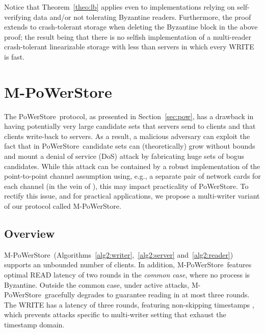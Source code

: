 \documentclass[10pt,conference,compsocconf]{IEEEtran}
\newcommand{\protocol}{PoWerStore}
\newcommand{\mprotocol}{M-PoWerStore}
\begin{document}
Notice that Theorem~\ref{theo:lb} applies even to implementations relying on self-verifying data and/or not tolerating Byzantine readers. Furthermore, the proof extends to crash-tolerant storage when deleting the Byzantine block  in the above proof; the result being that there is no selfish implementation of a multi-reader crash-tolerant linearizable storage with less than  servers in which every \textsc{WRITE} is fast.


\section{\mprotocol}\label{sec:mpow}

The \protocol\ protocol, as presented in Section~\ref{sec:pow}, has a drawback in having potentially very large candidate sets that servers send to clients and that clients write-back to servers. As a result, a malicious adversary can exploit the fact that in \protocol\ candidate sets can (theoretically) grow without bounds and mount
a denial of service (DoS) attack by fabricating huge sets of bogus candidates. While this attack can be contained by a robust implementation of the point-to-point channel assumption using, e.g., a separate pair of network cards for each channel (in the vein of \cite{CWADM09}), this may impact practicality of \protocol. To rectify this issue, and for practical applications, we propose a multi-writer variant of our protocol called \mprotocol.

\subsection{Overview}

\mprotocol\ (Algorithms~\ref{alg2:writer},~\ref{alg2:server} and~\ref{alg2:reader}) supports an unbounded number of clients. In addition, \mprotocol\ features optimal \textsc{READ} latency of two rounds in the \emph{common case}, where no process is Byzantine. Outside the common case, under active attacks, \mprotocol\ gracefully degrades to guarantee reading in at most three rounds. The \textsc{WRITE} has a latency of three rounds, featuring non-skipping timestamps \cite{BD04}, which prevents attacks specific to multi-writer setting that exhaust the timestamp domain.
\end{document}
